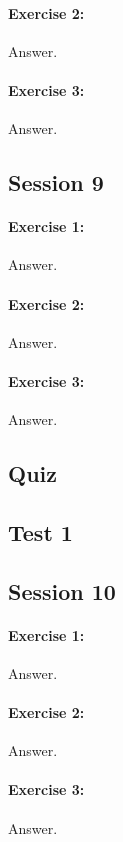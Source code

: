 \documentclass{article}
\begin{document}
\paragraph{Exercise 2:}
Answer.
\paragraph{Exercise 3:}
Answer.
\newpage

\subsection*{Session 9}
\paragraph{Exercise 1:}
Answer.
\paragraph{Exercise 2:}
Answer.
\paragraph{Exercise 3:}
Answer.
\newpage

\subsection*{Quiz}
\newpage

\subsection*{Test 1}
\newpage

\subsection*{Session 10}
\paragraph{Exercise 1:}
Answer.
\paragraph{Exercise 2:}
Answer.
\paragraph{Exercise 3:}
Answer.
\end{document}
